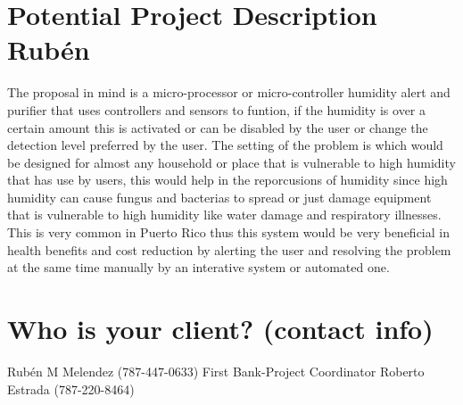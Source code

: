 \documentclass[12pt]{article}
\begin{document}
\section {Potential Project Description Rubén}
The proposal in mind is a micro-processor or micro-controller humidity alert and purifier that uses controllers and sensors to funtion, if the humidity is over a certain amount this is activated or can be disabled by the user or change the detection level preferred by the user. The setting of the problem is which would be designed for almost any household or place that is vulnerable to high humidity that has use by users, this would help in the reporcusions of humidity since high humidity can cause fungus and bacterias to spread or just damage equipment that is vulnerable to high humidity like water damage and respiratory illnesses. This is very common in Puerto Rico thus this system would be very beneficial in health benefits and cost reduction by alerting the user and resolving the problem at the same time manually by an interative system or automated one. 
\newpage
\section{Who is your client? (contact info)}
Rubén M Melendez (787-447-0633)
\newline
First Bank-Project Coordinator
\newline
Roberto Estrada (787-220-8464)
\end{document}
